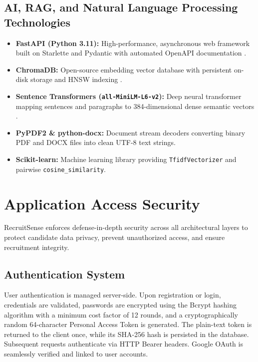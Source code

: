 \subsection{AI, RAG, and Natural Language Processing Technologies}
\begin{itemize}
    \item \textbf{FastAPI (Python 3.11):} High-performance, asynchronous web framework built on Starlette and Pydantic with automated OpenAPI documentation \cite{ramirez2019fastapi}.
    \item \textbf{ChromaDB:} Open-source embedding vector database with persistent on-disk storage and HNSW indexing \cite{malkov2018hnsw}.
    \item \textbf{Sentence Transformers (\texttt{all-MiniLM-L6-v2}):} Deep neural transformer mapping sentences and paragraphs to 384-dimensional dense semantic vectors \cite{reimers2019sentence}.
    \item \textbf{PyPDF2 \& python-docx:} Document stream decoders converting binary PDF and DOCX files into clean UTF-8 text strings.
    \item \textbf{Scikit-learn:} Machine learning library providing \texttt{TfidfVectorizer} and pairwise \texttt{cosine\_similarity}.
\end{itemize}

\section{Application Access Security}
RecruitSense enforces defense-in-depth security across all architectural layers to protect candidate data privacy, prevent unauthorized access, and ensure recruitment integrity.

\subsection{Authentication System}
User authentication is managed server-side. Upon registration or login, credentials are validated, passwords are encrypted using the Bcrypt hashing algorithm with a minimum cost factor of 12 rounds, and a cryptographically random 64-character Personal Access Token is generated. The plain-text token is returned to the client once, while its SHA-256 hash is persisted in the database. Subsequent requests authenticate via HTTP Bearer headers. Google OAuth is seamlessly verified and linked to user accounts.

